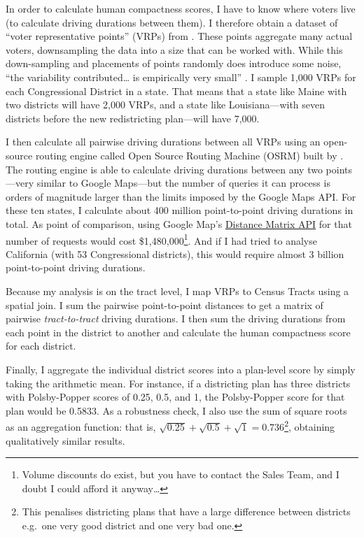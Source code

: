 \documentclass[]{article}
\begin{document}
In order to calculate human compactness scores, I have to know where
voters live (to calculate driving durations between them). I therefore
obtain a dataset of ``voter representative points'' (VRPs) from
\cite{er2019}. These points aggregate many actual voters, downsampling
the data into a size that can be worked with. While this down-sampling
and placements of points randomly does introduce some noise, ``the
variability contributed\ldots{} is empirically very small''
\citep{er2019}. I sample 1,000 VRPs for each Congressional District in a
state. That means that a state like Maine with two districts will have
2,000 VRPs, and a state like Louisiana---with seven districts before the
new redistricting plan---will have 7,000.

I then calculate all pairwise driving durations between all VRPs using
an open-source routing engine called Open Source Routing Machine (OSRM)
built by \cite{osrm}. The routing engine is able to calculate driving
durations between any two points---very similar to Google Maps---but the
number of queries it can process is orders of magnitude larger than the
limits imposed by the Google Maps API. For these ten states, I calculate
about 400 million point-to-point driving durations in total. As point of
comparison, using Google Map's
\href{https://developers.google.com/maps/documentation/distance-matrix/usage-and-billing}{Distance
Matrix API} for that number of requests would cost \$1,480,000\footnote{Volume
  discounts do exist, but you have to contact the Sales Team, and I
  doubt I could afford it anyway\ldots{}}. And if I had tried to analyse
California (with 53 Congressional districts), this would require almost
3 billion point-to-point driving durations.

Because my analysis is on the tract level, I map VRPs to Census Tracts
using a spatial join. I sum the pairwise point-to-point distances to get
a matrix of pairwise \emph{tract-to-tract} driving durations. I then sum
the driving durations from each point in the district to another and
calculate the human compactness score for each district.

Finally, I aggregate the individual district scores into a plan-level
score by simply taking the arithmetic mean. For instance, if a
districting plan has three districts with Polsby-Popper scores of 0.25,
0.5, and 1, the Polsby-Popper score for that plan would be 0.5833. As a
robustness check, I also use the sum of square roots as an aggregation
function: that is,
\(\sqrt{0.25} + \sqrt{0.5} + \sqrt{1} = 0.736\)\footnote{This penalises
  districting plans that have a large difference between districts
  e.g.~one very good district and one very bad one.}, obtaining
qualitatively similar results.
\end{document}
